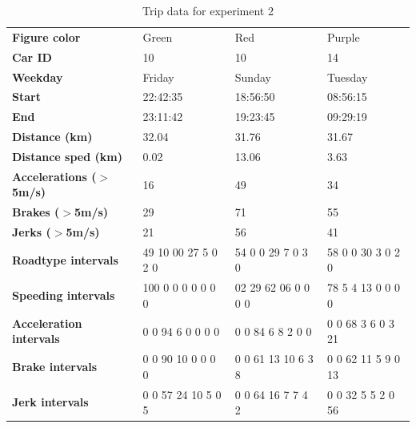 \begin{table}
    \centering
    \begin{tabular}{>{\bfseries}l|lll|}
    Figure color            & Green                & Red                 & Purple             \\
    Car ID                  & 10                   & 10                  & 14                 \\
    Weekday                 & Friday               & Sunday              & Tuesday            \\
    Start                   & 22:42:35             & 18:56:50            & 08:56:15           \\
    End                     & 23:11:42             & 19:23:45            & 09:29:19           \\
    Distance (km)           & 32.04                & 31.76               & 31.67              \\
    Distance sped (km)      & 0.02                 & 13.06               & 3.63               \\
    Accelerations ($>$5m/s) & 16                   & 49                  & 34                 \\
    Brakes ($>$5m/s)        & 29                   & 71                  & 55                 \\
    Jerks ($>$5m/s)         & 21                   & 56                  & 41                 \\
    Roadtype intervals      & 49 10 00 27 5  0 2 0 & 54 0 0 29 7 0 3 0   & 58 0 0 30 3 0 2 0  \\
    Speeding intervals      & 100 0 0 0 0 0 0 0    & 02 29 62 06 0 0 0 0 & 78 5 4 13 0 0 0 0  \\
    Acceleration intervals  & 0 0 94 6 0 0 0 0     & 0 0 84 6 8 2 0 0    & 0 0 68 3 6 0 3 21  \\
    Brake intervals         & 0 0 90 10 0 0 0 0    & 0 0 61 13 10 6 3 8  & 0 0 62 11 5 9 0 13 \\
    Jerk intervals          & 0 0 57 24 10 5 0 5   & 0 0 64 16 7 7 4 2   & 0 0 32 5 5 2 0 56  \\
    \end{tabular}
    \caption{Trip data for experiment 2}
    \label{tab:longtrips}
\end{table}
